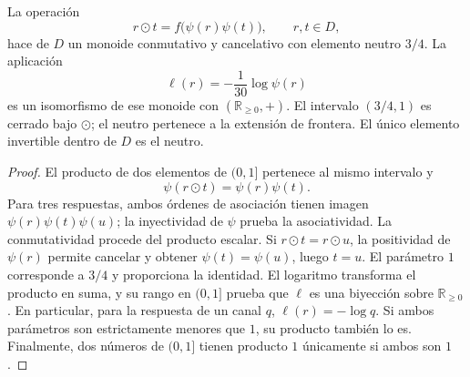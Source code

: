 \begin{proposition}
\label{amp-comp-monoid}
La operación
\begin{equation}
 r\odot t=f\bigl(\psi(r)\psi(t)\bigr),\qquad r,t\in D,
 \label{amp-comp-law}
\end{equation}
hace de $D$ un monoide conmutativo y cancelativo con elemento neutro $3/4$.
La aplicación
\begin{equation}
 \ell(r)=-\frac1{30}\log\psi(r)
 \label{amp-comp-character}
\end{equation}
es un isomorfismo de ese monoide con $(\mathbb R_{\geq0},+)$.
El intervalo $(3/4,1)$ es cerrado bajo $\odot$; el neutro pertenece a
la extensión de frontera. El único elemento invertible dentro de $D$
es el neutro.
\end{proposition}
\begin{proof}
El producto de dos elementos de $(0,1]$ pertenece al mismo intervalo y
\[
 \psi(r\odot t)=\psi(r)\psi(t).
\]
Para tres respuestas, ambos órdenes de asociación tienen imagen
$\psi(r)\psi(t)\psi(u)$; la inyectividad de $\psi$ prueba la
asociatividad. La conmutatividad procede del producto escalar. Si
$r\odot t=r\odot u$, la positividad de $\psi(r)$ permite cancelar y
obtener $\psi(t)=\psi(u)$, luego $t=u$. El parámetro $1$ corresponde a
$3/4$ y proporciona la identidad. El logaritmo transforma el producto en
suma, y su rango en $(0,1]$ prueba que $\ell$ es una biyección sobre
$\mathbb R_{\geq0}$. En particular, para la respuesta de un canal $q$,
$\ell(r)=-\log q$. Si ambos parámetros son estrictamente menores que
$1$, su producto también lo es. Finalmente, dos números de $(0,1]$
tienen producto $1$ únicamente si ambos son $1$.
\end{proof}

